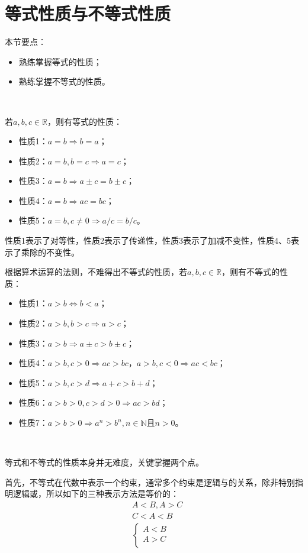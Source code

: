 \section{等式性质与不等式性质}

本节要点：
\begin{itemize}
    \item 熟练掌握等式的性质；
    \item 熟练掌握不等式的性质。
\end{itemize}

~

若$a,b,c\in \mathbb{R} $，则有等式的性质：
\begin{itemize}
    \item 性质1：$a=b\Rightarrow b=a$；
    \item 性质2：$a=b,b=c\Rightarrow a=c$；
    \item 性质3：$a=b\Rightarrow a\pm c=b\pm c$；
    \item 性质4：$a=b\Rightarrow ac=bc$；
    \item 性质5：$a=b,c\ne 0\Rightarrow a/c=b/c$。
\end{itemize}

\begin{tcolorbox}
性质1表示了对等性，性质2表示了传递性，性质3表示了加减不变性，性质4、5表示了乘除的不变性。
\end{tcolorbox}

根据算术运算的法则，不难得出不等式的性质，若$a,b,c\in \mathbb{R} $，则有不等式的性质：
\begin{itemize}
    \item 性质1：$a>b\Leftrightarrow b<a$；
    \item 性质2：$a>b,b>c\Rightarrow a>c$；
    \item 性质3：$a>b\Rightarrow a\pm c>b\pm c$；
    \item 性质4：$a>b,c>0\Rightarrow ac>bc$，$a>b,c<0\Rightarrow ac<bc$；
    \item 性质5：$a>b,c>d\Rightarrow a+c>b+d$；
    \item 性质6：$a>b>0,c>d>0\Rightarrow ac>bd$；
    \item 性质7：$a>b>0\Rightarrow a^n>b^n,n\in \mathbb{N} \text{且}n>0$。
\end{itemize}

~

等式和不等式的性质本身并无难度，关键掌握两个点。

首先，不等式在代数中表示一个约束，通常多个约束是逻辑与的关系，除非特别指明逻辑或，所以如下的三种表示方法是等价的：
\begin{align*}
&A<B,A>C \\
&C<A<B \\
&\left\{ \begin{array}{c}
	A<B\\
	A>C\\
\end{array} \right.
\end{align*}

